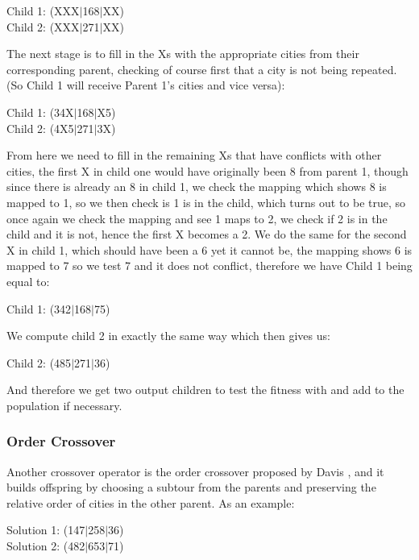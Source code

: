 \documentclass[11pt,a4paper,titlepage]{article}
\begin{document}
\begin{center}\Large
Child 1: (XXX$|$168$|$XX)\\
Child 2: (XXX$|$271$|$XX)
\end{center}

The next stage is to fill in the Xs with the appropriate cities from their corresponding parent, checking of course first that a city is not being repeated. (So Child 1 will receive Parent 1's cities and vice versa):

\begin{center}\Large
Child 1: (34X$|$168$|$X5)\\
Child 2: (4X5$|$271$|$3X)
\end{center}

From here we need to fill in the remaining Xs that have conflicts with other cities, the first X in child one would have originally been 8 from parent 1, though since there is already an 8 in child 1, we check the mapping which shows 8 is mapped to 1, so we then check is 1 is in the child, which turns out to be true, so once again we check the mapping and see 1 maps to 2, we check if 2 is in the child and it is not, hence the first X becomes a 2. We do the same for the second X in child 1, which should have been a 6 yet it cannot be, the mapping shows 6 is mapped to 7 so we test 7 and it does not conflict, therefore we have Child 1 being equal to:

\begin{center}\Large
Child 1: (342$|$168$|$75)
\end{center}

We compute child 2 in exactly the same way which then gives us:

\begin{center}\Large
Child 2: (485$|$271$|$36)
\end{center}

And therefore we get two output children to test the fitness with and add to the population if necessary.

\subsubsection{Order Crossover}

Another crossover operator is the order crossover proposed by Davis \cite{GACrossover}, and it builds offspring by choosing a subtour from the parents and preserving the relative order of cities in the other parent. As an example:

\begin{center}\Large
Solution 1: (147$|$258$|$36)\\
Solution 2: (482$|$653$|$71)
\end{center}
\end{document}
